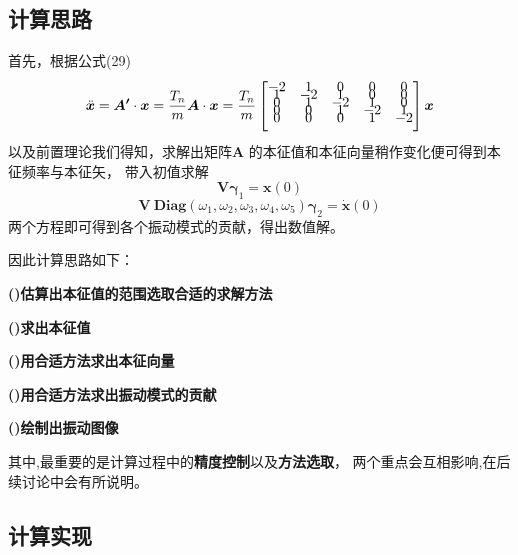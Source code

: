 \documentclass[11pt, a4paper, oneside]{ctexart}
\begin{document}
{\subsection{计算思路}
{
    首先，根据公式(29)
    $$
        \ddot{\boldsymbol{x}}=\boldsymbol{A'} \cdot \boldsymbol{x}=\frac{T_n}{m}\boldsymbol{A} \cdot \boldsymbol{x}=\frac{T_n}{m}\left
        [\begin{matrix}\vspace{-1.5ex}
        -2 & 1 & 0 & 0 & 0 \\\vspace{-1.5ex} 
        1 & -2 & 1 & 0 & 0 \\\vspace{-1.5ex} 
        0 & 1 & -2 & 1 & 0 \\\vspace{-1.5ex} 
        0 & 0 & 1 & -2 & 1 \\\vspace{-1.5ex} 
        0 & 0 & 0 & 1 & -2\vspace{2.5ex} 
        \end{matrix}\right] \boldsymbol{x}
    $$
以及前置理论我们得知，求解出矩阵$\boldsymbol A$
的本征值和本征向量稍作变化便可得到本征频率与本征矢，
带入初值求解
$$
    \boldsymbol {V} \boldsymbol\gamma_1 = \boldsymbol x(0)
$$$$
    \boldsymbol {V}\  \boldsymbol{Diag}(\omega_1,\omega_2,\omega_3,\omega_4,\omega_5)\boldsymbol\gamma_2 = \boldsymbol{\dot x}(0) 
$$
两个方程即可得到各个振动模式的贡献，得出数值解。

因此计算思路如下：


{\hspace{8mm}\textbf{()估算出本征值的范围选取合适的求解方法}

\hspace{8mm}\textbf{()求出本征值}

\hspace{8mm}\textbf{()用合适方法求出本征向量}

\hspace{8mm}\textbf{()用合适方法求出振动模式的贡献}

\hspace{8mm}\textbf{()绘制出振动图像}}

其中,最重要的是计算过程中的\textbf{精度控制}以及\textbf{方法选取}，
两个重点会互相影响,在后续讨论中会有所说明。


}

\subsection{计算实现}
}
\end{document}
